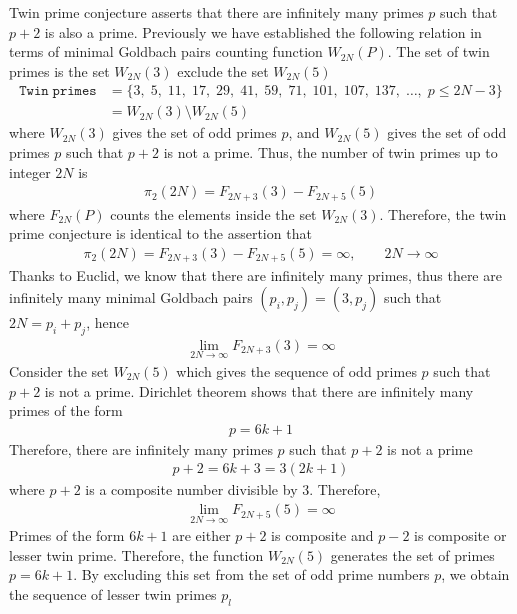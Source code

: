 ﻿Twin prime conjecture asserts that there are infinitely many primes $p$ such that $p+2$ is also a prime.
Previously we have established the following relation in terms of minimal Goldbach pairs counting function
$W_{2N}(P)$.
The set of twin primes is the set $W_{2N}(3)$ exclude the set $W_{2N}(5)$
\begin{align*}
    \mathtt{Twin \; primes} &= \{ 3, \; 5, \; 11, \; 17, \; 29, \; 41, \; 59, \; 71, \; 101, \; 107, \; 137, \; \dots, \;  p \leq 2N - 3 \} \\
    &= W_{2N}(3) \setminus W_{2N}(5)
\end{align*}
where $W_{2N}(3)$ gives the set of odd primes $p$, and $W_{2N}(5)$ gives the set of odd primes $p$ such that $p+2$
is not a prime.
Thus, the number of twin primes up to integer $2N$ is
\begin{align*}
    \pi_2 (2N) = F_{2N+3}(3) - F_{2N+5}(5)
\end{align*}
where $F_{2N}(P)$ counts the elements inside the set $W_{2N}(3)$.
Therefore, the twin prime conjecture is identical to the assertion that
\begin{align*}
    \pi_2 (2N) = F_{2N+3}(3) - F_{2N+5}(5) = \infty, \quad \quad 2N\to\infty
\end{align*}
Thanks to Euclid, we know that there are infinitely many primes, thus
there are infinitely many minimal Goldbach pairs $(p_i, p_j) = (3, p_j)$ such that $2N=p_i+p_j$,
hence
\begin{align*}
    \lim_{2N\to\infty} F_{2N+3}(3) = \infty
\end{align*}
Consider the set $W_{2N}(5)$ which gives the sequence of odd primes $p$ such that $p+2$ is not a prime.
Dirichlet theorem shows that there are infinitely many primes of the form
\begin{align*}
    p = 6k+1
\end{align*}
Therefore, there are infinitely many primes $p$ such that $p+2$ is not a prime
\begin{align*}
    p+2 = 6k+3 = 3(2k+1)
\end{align*}
where $p+2$ is a composite number divisible by 3.
Therefore,
\begin{align*}
    \lim_{2N\to\infty} F_{2N+5}(5) = \infty
\end{align*}
Primes of the form $6k+1$ are either $p+2$ is composite and $p-2$ is composite or lesser twin prime.
Therefore, the function $W_{2N}(5)$ generates the set of primes $p=6k+1$.
By excluding this set from the set of odd prime numbers $p$,
we obtain the sequence of lesser twin primes $p_l$
